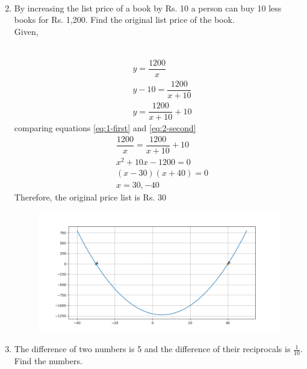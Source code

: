 \documentclass[journal,12pt,twocolumn]{IEEEtran}
\renewcommand\thesection{\arabic{section}}
\begin{document}
\begin{enumerate}[label=\thesection.\arabic*.,ref=\thesection.\theenumi]
\begin{align}
\end{align}
\item  By increasing the list price of a book by Rs. 10 a person can buy 10 less books for Rs. 1,200. Find the original list price of the book.\\
\solution
Given, \\  
\begin{table}[ht]
 \centering
 \caption{}
 \end{table}\\
\begin{align}
&y = \dfrac{1200}{x} \\ \label{eq:1-first}
&y-10 = \dfrac{1200}{x+10}\\
&y = \dfrac{1200}{x+10} +10  \label{eq:2-second}
\end{align}
comparing equations \eqref{eq:1-first} and \eqref{eq:2-second}
\begin{align}
& \dfrac{1200}{x} =  \dfrac{1200}{x+10} +10\\
&x^2+10x-1200 = 0\\
&(x-30)(x+40)=0\\
&x = 30,-40
\end{align}
Therefore, the original price list is Rs. 30 
  \begin{figure}[H]
	\centering
    \includegraphics[width=\columnwidth]{a_4.png}
    \caption{}
    \label{a_4}
\end{figure}
\item The difference of two numbers is 5 and the difference of their reciprocals is $\displaystyle\frac{1}{10}$. Find the numbers.\\

\end{enumerate}
\end{document}
